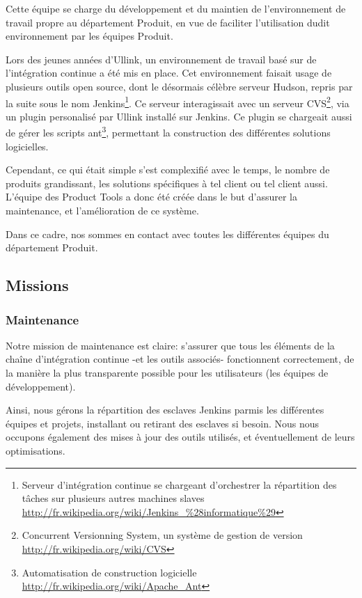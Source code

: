 \documentclass[a4paper, 12pt]{article}
\begin{document}
Cette équipe se charge du développement et du maintien de l'environnement de travail propre au département Produit, en vue de faciliter l'utilisation dudit environnement par les équipes Produit.

Lors des jeunes années d'Ullink, un environnement de travail basé sur de l'intégration continue a été mis en place. Cet environnement faisait usage de plusieurs outils open source, dont le désormais célèbre serveur Hudson, repris par la suite sous le nom Jenkins\footnote{Serveur d'intégration continue se chargeant d'orchestrer la répartition des tâches sur plusieurs autres machines slaves \\
\url{http://fr.wikipedia.org/wiki/Jenkins_\%28informatique\%29}}. Ce serveur interagissait avec un serveur CVS\footnote{Concurrent Versionning System, un système de gestion de version\\
\url{http://fr.wikipedia.org/wiki/CVS}}, via un plugin personalisé par Ullink installé sur Jenkins. Ce plugin se chargeait aussi de gérer les scripts ant\footnote{Automatisation de construction logicielle\\
\url{http://fr.wikipedia.org/wiki/Apache_Ant}}, permettant la construction des différentes solutions logicielles.

Cependant, ce qui était simple s'est complexifié avec le temps, le nombre de produits grandissant, les solutions spécifiques à tel client ou tel client aussi. L'équipe des Product Tools a donc été créée dans le but d'assurer la maintenance, et l'amélioration de ce système.

Dans ce cadre, nos sommes en contact avec toutes les différentes équipes du département Produit.

\subsection{Missions}
\subsubsection{Maintenance}

Notre mission de maintenance est claire: s'assurer que tous les éléments de la chaîne d'intégration continue -et les outils associés- fonctionnent correctement, de la manière la plus transparente possible pour les utilisateurs (les équipes de développement).

Ainsi, nous gérons la répartition des esclaves Jenkins parmis les différentes équipes et projets, installant ou retirant des esclaves si besoin. Nous nous occupons également des mises à jour des outils utilisés, et éventuellement de leurs optimisations.
\end{document}
